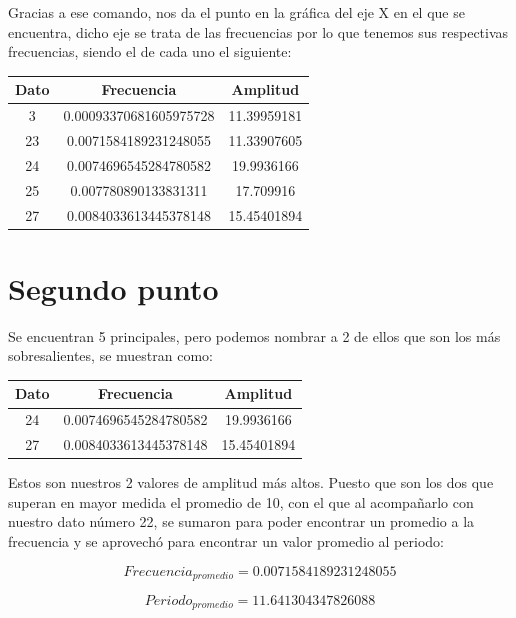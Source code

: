 \documentclass[a4paper,12pt]{article}
\begin{document}
\noindent
Gracias a ese comando, nos da el punto en la gráfica del eje X en el que se encuentra, dicho eje se trata de las frecuencias por lo que tenemos sus respectivas frecuencias, siendo el de cada uno el siguiente:
\begin{center}
\begin{tabular}{|c|c|c|}
\hline
Dato & Frecuencia & Amplitud \\ \hline
3 & 0.00093370681605975728 &11.39959181\\ \hline
23 & 0.0071584189231248055 &11.33907605\\ \hline
24 &0.0074696545284780582 &19.9936166\\ \hline
25 &0.007780890133831311 &17.709916\\ \hline
27 &0.0084033613445378148 &15.45401894\\ \hline
\end{tabular}
\end{center}

\section{Segundo punto}
\noindent
Se encuentran 5 principales, pero podemos nombrar a 2 de ellos que son los más sobresalientes, se muestran como:
\begin{center}
\begin{tabular}{|c|c|c|}
\hline
Dato & Frecuencia & Amplitud \\ \hline
24 &0.0074696545284780582 &19.9936166\\ \hline
27 &0.0084033613445378148 &15.45401894\\ \hline
\end{tabular}
\end{center}

\noindent
Estos son nuestros 2 valores de amplitud más altos. Puesto que son los dos que superan en mayor medida el promedio de 10, con el que al acompañarlo con nuestro dato número 22, se sumaron para poder encontrar un promedio a la frecuencia y se aprovechó para encontrar un valor promedio al periodo:

\begin{equation*}
Frecuencia_{promedio} = 0.0071584189231248055
\end{equation*}

\begin{equation*}
Periodo_{promedio}=11.641304347826088
\end{equation*}
\end{document}
